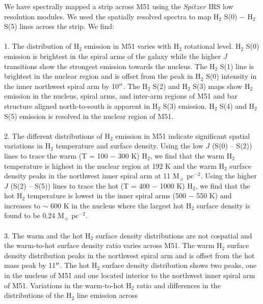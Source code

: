 \documentclass[manuscript]{aastex}
\begin{document}
We have spectrally mapped a strip across M51 using the $Spitzer$ IRS
low resolution modules.  We used the spatially resolved spectra to map
$\mathrm{H_2}$ S(0) $-$ $\mathrm{H_2}$ S(5) lines across
the strip.  We find:\\
\\
1.  The distribution of $\mathrm{H_2}$
emission in M51 varies with $\mathrm{H_2}$ rotational level.
$\mathrm{H_2}$ S(0) emission is brightest in the spiral arms of the
galaxy while the higher $J$ transitions show the strongest emission
towards the nucleus.  The $\mathrm{H_2}$ S(1) line is brightest
in the nuclear region and is offset from the peak in H$_2$ S(0) 
intensity in the inner northwest spiral arm by 10$\mbox{$^{\prime\prime}$}$.
The $\mathrm{H_2}$ S(2) and $\mathrm{H_2}$ S(3) maps show
$\mathrm{H_2}$ emission in the nucleus, spiral arms, and inter-arm
regions of M51 and bar structure aligned north-to-south is apparent in
$\mathrm{H_2}$ S(3) emission.  $\mathrm{H_2}$ S(4) and $\mathrm{H_2}$
S(5) emission is resolved in the nuclear region of M51.\\
\\
2.  The different distributions of $\mathrm{H_2}$ emission in M51
indicate significant spatial variations in $\mathrm{H_2}$
temperature and surface density.  Using the low $J$ (S(0) -- S(2)) lines to trace the warm (T = 100
$-$ 300 K) $\mathrm{H_2}$, we find that the warm $\mathrm{H_2}$
temperature is highest in the nuclear region at 192 K and
the warm $\mathrm{H_2}$ surface density peaks in the northwest inner spiral arm
at 11 $\mathrm{M_\sun}$ $\mathrm{pc^{-2}}$.  Using the
higher $J$ (S(2) -- S(5)) lines to trace the hot (T = 400 $-$ 1000 K) $\mathrm{H_2}$,
we find that the hot $\mathrm{H_2}$ temperature is lowest
in the inner spiral arms (500 $-$ 550 K) and increases to $\sim$ 600 K
in the nucleus where the largest hot $\mathrm{H_2}$ surface density
is found to be 0.24 $\mathrm{M_\sun}$ $\mathrm{pc^{-2}}$.\\
\\
3.  The warm and the hot $\mathrm{H_2}$ surface density distributions are not
cospatial and the warm-to-hot surface density ratio varies across M51.  The warm
H$_2$ surface density distribution peaks in the northwest spiral arm and is offset from
the hot mass peak by 11$\mbox{$^{\prime\prime}$}$.  The hot H$_2$ surface density distribution 
shows two peaks, one in the nucleus of M51 and one located interior to the 
northwest inner spiral arm of M51.   Variations in the
warm-to-hot $\mathrm{H_2}$ ratio and differences in the
distributions of the $\mathrm{H_2}$ line emission across 
\end{document}
